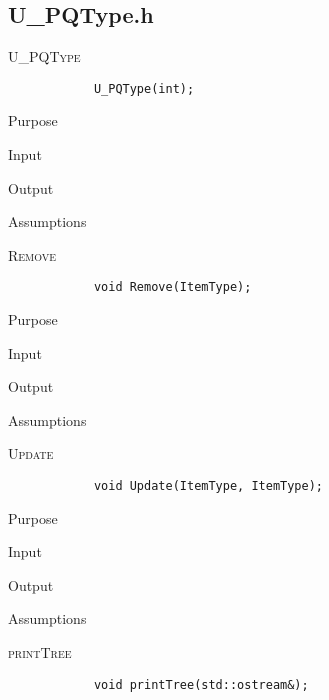 \documentclass[pdftex, 12pt]{article}
\begin{document}
\subsection{U\_PQType.h}
\begin{description}

	\item{\textsc{U\_PQType}}
		\begin{lstlisting}
			U_PQType(int);
		\end{lstlisting}
		\begin{description}

			\item{Purpose}

			\item{Input}

			\item{Output}

			\item{Assumptions}

		\end{description}
	\item{\textsc{Remove}}
		\begin{lstlisting}
			void Remove(ItemType);
		\end{lstlisting}
		\begin{description}

			\item{Purpose}

			\item{Input}

			\item{Output}

			\item{Assumptions}

		\end{description}
	\item{\textsc{Update}}
		\begin{lstlisting}
			void Update(ItemType, ItemType);
		\end{lstlisting}
		\begin{description}

			\item{Purpose}

			\item{Input}

			\item{Output}

			\item{Assumptions}

		\end{description}
	\item{\textsc{printTree}}
		\begin{lstlisting}
			void printTree(std::ostream&);
		\end{lstlisting}
		\begin{description}


\end{description}
\end{description}
\end{document}
